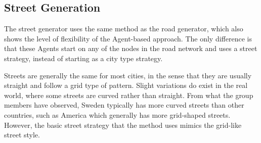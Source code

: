 \subsection{Street Generation}
The street generator uses the same method as the road generator, which also shows the level of flexibility of the Agent-based approach.
The only difference is that these Agents start on any of the nodes in the road network and uses a street strategy, instead of starting as a city type strategy.

Streets are generally the same for most cities, in the sense that they are usually straight and follow a grid type of pattern.
Slight variations do exist in the real world, where some streets are curved rather than straight.
From what the group members have observed, Sweden typically has more curved streets than other countries, such as America which generally has more grid-shaped streets.
However, the basic street strategy that the method uses mimics the grid-like street style.
